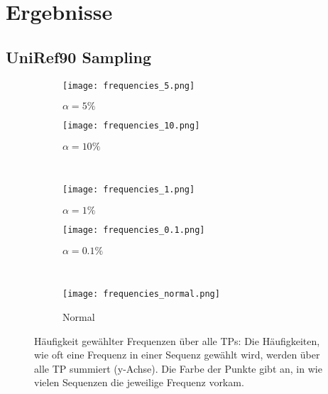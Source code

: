 \section{Ergebnisse} %
    \label{sec:ergebnisse}
    \subsection{UniRef90 Sampling} %
        \label{sub:uniref90_results}
        \begin{figure}[H]
            \centering
            \begin{subfigure}{.45\textwidth}
                \texttt{[image: frequencies\_5.png]}
                \caption{$\alpha=5\%$}
                \label{fig:frequencies_5}
            \end{subfigure}
            \begin{subfigure}{.45\textwidth}
                \texttt{[image: frequencies\_10.png]}
                \caption{$\alpha=10\%$}
                \label{fig:frequencies_10}
            \end{subfigure}\\
            \begin{subfigure}{.45\textwidth}
                \texttt{[image: frequencies\_1.png]}
                \caption{$\alpha=1\%$}
                \label{fig:frequencies_1}
            \end{subfigure}
            \begin{subfigure}{.45\textwidth}
                \texttt{[image: frequencies\_0.1.png]}
                \caption{$\alpha=0.1\%$}
                \label{fig:frequencies_0.1}
            \end{subfigure}\\
            \begin{subfigure}{.45\textwidth}
                \texttt{[image: frequencies\_normal.png]}
                \caption{Normal}
                \label{fig:frequencies_normal}
            \end{subfigure}
            \caption[Häufigkeit gewählter Frequenzen über alle \aclp{TP} ]{Häufigkeit gewählter Frequenzen über alle \aclp{TP}: Die Häufigkeiten, wie oft eine Frequenz in einer Sequenz gewählt wird, werden über alle \ac{TP} summiert (y-Achse). Die Farbe der Punkte gibt an, in wie vielen Sequenzen die jeweilige Frequenz vorkam.}
            \label{fig:frequencies_uniref}
        \end{figure}

